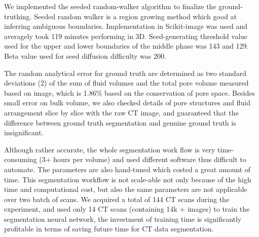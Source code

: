 \documentclass[draft,linenumbers]{agujournal2018}
\begin{document}
We implemented the seeded random-walker algorithm \citep{grady2006random} to finalize the ground-truthing. Seeded random walker is a region growing method which good at inferring ambiguous boundaries. Implementation in Scikit-image was used and averagely took 119 minutes performing in 3D. Seed-generating threshold value used for the upper and lower boundaries of the middle phase was 143 and 129. Beta value used for seed diffusion difficulty was 200.

The random analytical error for ground truth are determined as two standard deviations (2\textsigma) of the sum of fluid volumes and the total pore volume measured based on image, which is 1.86\% based on the conservation of pore space. Besides small error on bulk volume, we also checked details of pore structures and fluid arrangement slice by slice with the raw \textmu CT image, and guaranteed that the difference between ground truth segmentation and genuine ground truth is insignificant.

Although rather accurate, the whole segmentation work flow is very time-consuming (3+ hours per volume) and used different software thus difficult to automate. The parameters are also hand-tuned which costed a great amount of time. This segmentation workflow is not scale-able not only because of the high time and computational cost, but also the same parameters are not applicable over two batch of scans. We acquired a total of 144 \textmu CT scans during the experiment, and used only 14 \textmu CT scans (containing 14k + images) to train the segmentation neural network, the investment of training time is significantly profitable in terms of saving future time for \textmu CT data segmentation.
\end{document}
